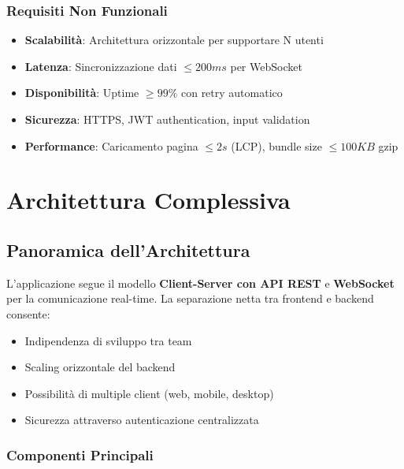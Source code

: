 \documentclass[12pt,a4paper]{report}
\begin{document}
\subsection{Requisiti Non Funzionali}

\begin{itemize}
    \item \textbf{Scalabilità}: Architettura orizzontale per supportare N utenti
    \item \textbf{Latenza}: Sincronizzazione dati $\leq 200ms$ per WebSocket
    \item \textbf{Disponibilità}: Uptime $\geq 99\%$ con retry automatico
    \item \textbf{Sicurezza}: HTTPS, JWT authentication, input validation
    \item \textbf{Performance}: Caricamento pagina $\leq 2s$ (LCP), bundle size $\leq 100KB$ gzip
\end{itemize}

\newpage

\chapter{Architettura Complessiva}

\section{Panoramica dell'Architettura}

L'applicazione segue il modello \textbf{Client-Server con API REST} e \textbf{WebSocket} per la comunicazione real-time. La separazione netta tra frontend e backend consente:

\begin{itemize}
    \item Indipendenza di sviluppo tra team
    \item Scaling orizzontale del backend
    \item Possibilità di multiple client (web, mobile, desktop)
    \item Sicurezza attraverso autenticazione centralizzata
\end{itemize}

\subsection{Componenti Principali}
\end{document}
